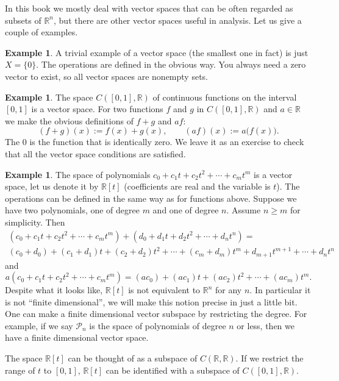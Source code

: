 \documentclass[12pt]{book}
\newcommand{\R}{{\mathbb{R}}}
\newcommand{\sP}{{\mathcal{P}}}
\theoremstyle{plain}
\theoremstyle{remark}
\theoremstyle{definition}
\theoremstyle{exercise}
\theoremstyle{example}
\newtheorem{example}[thm]{Example}
\begin{document}
In this book we mostly deal with vector spaces that can be often regarded as
subsets of $\R^n$, but there are other vector spaces useful in
analysis.  Let us give a couple of examples.

\begin{example}
A trivial example of a vector space (the smallest one in fact) is just
$X = \{ 0 \}$.  The operations are defined in the obvious way.  You always
need a zero vector to exist, so all vector spaces are nonempty sets.
\end{example}

\begin{example}
The space $C([0,1],\R)$ of continuous functions on the interval $[0,1]$
is a vector space.  For two functions $f$ and $g$ in $C([0,1],\R)$ and
$a \in \R$ we make the obvious definitions of $f+g$ and $af$:
\begin{equation*}
(f+g)(x) := f(x) + g(x), \qquad (af) (x) := a\bigl(f(x)\bigr) .
\end{equation*}
The 0 is the function that is identically zero.  We leave it as an exercise
to check that all the vector space conditions are satisfied.
\end{example}

\begin{example}
The space of polynomials $c_0 + c_1 t + c_2 t^2 + \cdots + c_m t^m$
is a vector space, let us denote it by $\R[t]$ (coefficients are real and
the variable is $t$).  The operations can be defined in the same way as for
functions above.
Suppose we have
two polynomials, one of degree $m$ and one of degree $n$.  Assume $n
\geq m$ for simplicity.  Then
\begin{multline*}
(c_0 + c_1 t + c_2 t^2 + \cdots + c_m t^m)
+
(d_0 + d_1 t + d_2 t^2 + \cdots + d_n t^n)
= \\
(c_0+d_0) + (c_1+d_1) t + (c_2 + d_2) t^2 + \cdots + (c_m+d_m) t^m
+ d_{m+1} t^{m+1} + \cdots + d_n t^n
\end{multline*}
and
\begin{equation*}
a(c_0 + c_1 t + c_2 t^2 + \cdots + c_m t^m)
=
(ac_0) + (ac_1) t + (ac_2) t^2 + \cdots + (ac_m) t^m  .
\end{equation*}
Despite what it looks like, $\R[t]$ is not equivalent to $\R^n$ for any $n$.  In
particular it is not ``finite dimensional'', we will make this notion
precise in just a little bit.  One can make a finite
dimensional vector subspace by restricting the degree.  For example,
if we say $\sP_n$ is the space of polynomials of degree $n$ or less,
then we have a finite dimensional vector space.

The space $\R[t]$ can be thought of as a subspace of $C(\R,\R)$.  If we
restrict the range of $t$ to $[0,1]$, $\R[t]$ can be identified with
a subspace of $C([0,1],\R)$.
\end{example}
\end{document}
